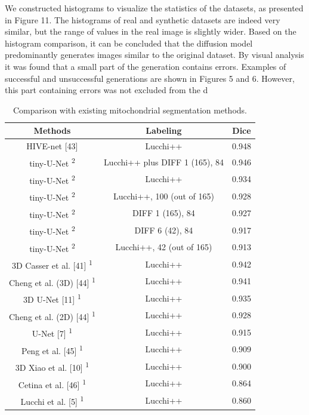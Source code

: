 \documentclass[journal,article,submit,pdftex,moreauthors]{Definitions/mdpi}
\begin{document}
We constructed histograms to visualize the statistics of the datasets, as presented in Figure 11. The histograms of real and synthetic datasets are indeed very similar, but the range of values in the real image is slightly wider. Based on the histogram comparison, it can be concluded that the diffusion model predominantly generates images similar to the original dataset. By visual analysis it was found that a small part of the generation contains errors. Examples of successful and unsuccessful generations are shown in Figures 5 and 6. However, this part containing errors was not excluded from the d

\begin{table}[H] 
	\caption{Comparison with existing mitochondrial segmentation methods.}
		\begin{tabularx}{\textwidth}{CCC}
			\toprule
			\textbf{Methods}	& \textbf{Labeling}	& \textbf{Dice}\\
			\midrule
				HIVE-net [43] & Lucchi++ & 0.948\\
				tiny-U-Net \textsuperscript{2} & Lucchi++ plus DIFF 1 (165), 84 & 0.946\\
				tiny-U-Net \textsuperscript{2} & Lucchi++ & 0.934\\
				tiny-U-Net \textsuperscript{2} & Lucchi++, 100 (out of 165) & 0.928\\
				tiny-U-Net \textsuperscript{2} & DIFF 1 (165), 84 & 0.927\\
				tiny-U-Net \textsuperscript{2} & DIFF 6 (42), 84 & 0.917\\
				tiny-U-Net \textsuperscript{2} & Lucchi++, 42 (out of 165) & 0.913\\
				3D Casser et al. [41] \textsuperscript{1} & Lucchi++ & 0.942\\
				Cheng et al. (3D) [44] \textsuperscript{1} & Lucchi++ & 0.941\\
				3D U-Net [11] \textsuperscript{1} & Lucchi++ & 0.935\\
				Cheng et al. (2D) [44] \textsuperscript{1} & Lucchi++ & 0.928\\
				U-Net [7] \textsuperscript{1} & Lucchi++ & 0.915\\
				Peng et al. [45] \textsuperscript{1} & Lucchi++ & 0.909\\
				3D Xiao et al. [10] \textsuperscript{1} & Lucchi++ & 0.900\\
				Cetina et al. [46] \textsuperscript{1} & Lucchi++ & 0.864\\
				Lucchi et al. [5] \textsuperscript{1} & Lucchi++ & 0.860\\
			\bottomrule
		\end{tabularx}
\end{table}
\end{document}
